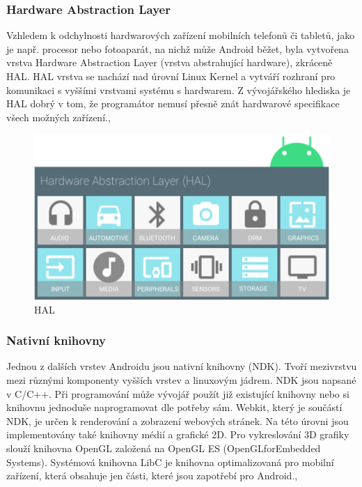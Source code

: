 \documentclass{vskpou} %
\begin{document}
\subsubsection{Hardware Abstraction Layer}
Vzhledem k odchylnosti hardwarových zařízení mobilních telefonů či tabletů, jako je např. procesor nebo fotoaparát, na nichž může Android běžet, byla vytvořena vrstva Hardware Abstraction Layer (vrstva abstrahující hardware), zkráceně HAL. HAL vrstva se nachází nad úrovní Linux Kernel a vytváří rozhraní pro komunikaci s vyššími vrstvami systému s hardwarem. Z vývojářského hlediska je HAL dobrý v tom, že programátor nemusí přesně znát hardwarové specifikace všech možných zařízení.\cite{10},\cite{17}


\begin{figure}[h!]
\centering
\includegraphics[scale=0.5]{images/3.jpg}
\caption{HAL}
\label{3}
\end{figure}

\subsubsection{Nativní knihovny}
Jednou z dalších vrstev Androidu jsou nativní knihovny (NDK). Tvoří mezivrstvu mezi různými komponenty vyšších vrstev a linuxovým jádrem. NDK jsou napsané v C/C++. Při programování může vývojář použít již existující knihovny nebo si knihovnu jednoduše naprogramovat dle potřeby sám. Webkit, který je součástí NDK, je určen k renderování a zobrazení webových stránek. Na této úrovni jsou implementovány také knihovny médií a grafické 2D. Pro vykreslování 3D grafiky slouží knihovna OpenGL založená na OpenGL ES (OpenGLforEmbedded Systems). Systémová knihovna LibC je knihovna optimalizovaná pro mobilní zařízení, která obsahuje jen části, které jsou zapotřebí pro Android.\cite{10},\cite{17} 
\end{document}
